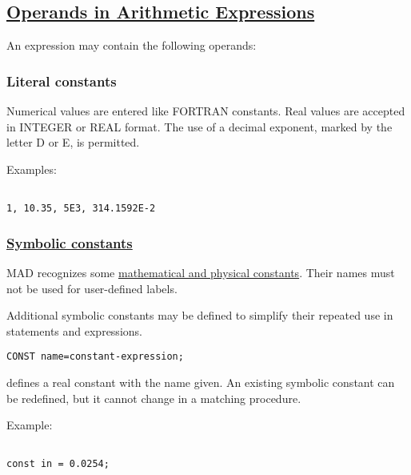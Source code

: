 \subsection{\href{operand}{ Operands in Arithmetic Expressions}} An expression may contain the following operands:  

\subsubsection{Literal constants} Numerical values are entered like FORTRAN constants. Real values are accepted in INTEGER or REAL format. The use of a decimal exponent, marked by the letter D or E, is permitted. 

 Examples: 
\begin{verbatim}

1, 10.35, 5E3, 314.1592E-2
\end{verbatim}

\subsubsection{\href{constant}{Symbolic constants}} MAD recognizes some \hyperlink{constant}{mathematical and physical constants}. Their names must not be used for user-defined labels. 

 Additional symbolic constants may be defined to simplify their repeated use in statements and expressions. 
\begin{verbatim}
CONST name=constant-expression;\end{verbatim} defines a real constant with the name given. An existing symbolic constant can be redefined, but it cannot change in a matching procedure. 

 Example: 
\begin{verbatim}

const in = 0.0254;
\end{verbatim}

